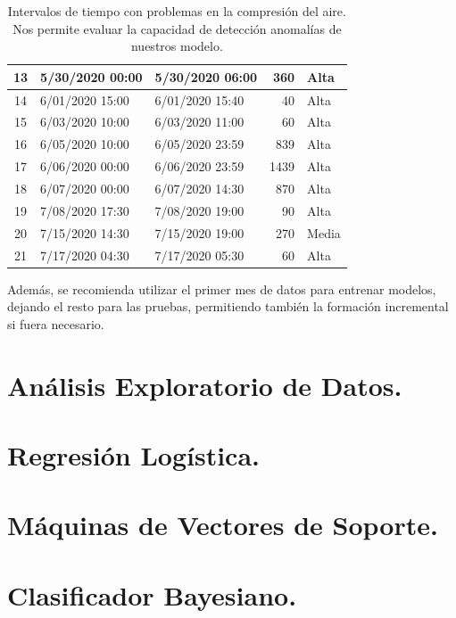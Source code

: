 \documentclass[12pt,letterpaper]{article}
\begin{document}
\begin{table}[!ht]
\begin{tabular}{|c|l|l|r|l|}
13           & 5/30/2020 00:00          & 5/30/2020 06:00           & 360                & Alta              \\ \hline
14           & 6/01/2020 15:00          & 6/01/2020 15:40           & 40                 & Alta              \\ \hline
15           & 6/03/2020 10:00          & 6/03/2020 11:00           & 60                 & Alta              \\ \hline
16           & 6/05/2020 10:00          & 6/05/2020 23:59           & 839                & Alta              \\ \hline
17           & 6/06/2020 00:00          & 6/06/2020 23:59           & 1439               & Alta              \\ \hline
18           & 6/07/2020 00:00          & 6/07/2020 14:30           & 870                & Alta              \\ \hline
19           & 7/08/2020 17:30          & 7/08/2020 19:00           & 90                 & Alta              \\ \hline
20           & 7/15/2020 14:30          & 7/15/2020 19:00           & 270                & Media            \\ \hline
21           & 7/17/2020 04:30          & 7/17/2020 05:30           & 60                 & Alta              \\ \hline
\end{tabular}
    \caption{
    Intervalos de tiempo con problemas en la compresión del aire.
    Nos permite evaluar la capacidad de detección anomalías de nuestros modelo.}
    \label{tab:Reportes}
\end{table}

Además, se recomienda utilizar el primer mes de datos para entrenar modelos, dejando el resto para las pruebas, permitiendo también la formación incremental si fuera necesario.


\section{Análisis Exploratorio de Datos.}
\section{Regresión Logística.}
\section{Máquinas de Vectores de Soporte.}
\section{Clasificador Bayesiano.}
\end{document}
